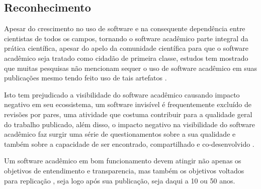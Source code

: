 
\subsection{Reconhecimento}


Apesar do crescimento no uso de software e na consequente dependência entre
cientistas de todos os campos, tornando o software acadêmico parte integral da
prática científica, apesar do apelo da comunidade científica para que o
software acadêmico seja tratado como cidadão de primeira classe, estudos tem
mostrado que muitas pesquisas não mencionam sequer o uso de software acadêmico
em suas publicações mesmo tendo feito uso de tais artefatos
\cite{momcheva2015software} \cite{howison2016software}.

Isto tem prejudicado a visibilidade do software acadêmico causando impacto
negativo em seu ecossistema, um software invisível é frequentemente excluído de
revisões por pares, uma atividade que costuma contribuir para a qualidade geral
do trabalho publicado, além disso, o
impacto negativo na visibilidade do software acadêmico faz surgir uma
série de questionamentos sobre a sua qualidade e também sobre a
capacidade de ser encontrado, compartilhado e co-desenvolvido
\cite{howison2013, katz2014transitive} \cite{howison2016software}.

Um software acadêmico em bom funcionamento devem atingir não apenas os
objetivos de entendimento e transparencia, mas também os objetivos voltados
para replicação \cite{Stodden2010}, seja logo após sua publicação, seja daqui
a 10 ou 50 anos.






